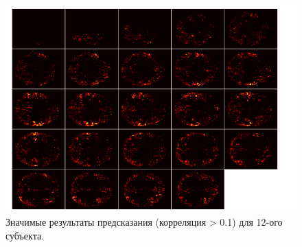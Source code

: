 \documentclass[pdftex,ptm,12pt,a4paper]{report}
\theoremstyle{definition}
\begin{document}
\begin{figure}[h]
\includegraphics[scale=0.7]{graphics/sub12_trunk01.png}
\centering
\caption{Значимые результаты предсказания (корреляция > 0.1) для 12-ого субъекта.}
\label{sub12_mosaic}
\end{figure}
\end{document}
